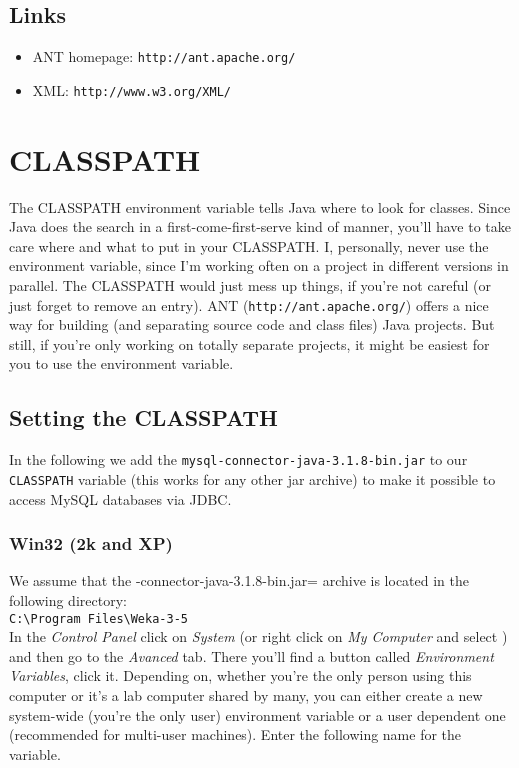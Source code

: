 \subsection{Links}
\begin{itemize}
\item ANT homepage: \verb=http://ant.apache.org/=
\item XML: \verb=http://www.w3.org/XML/=
\end{itemize}


\section{CLASSPATH}
\label{CLASSPATH}
The CLASSPATH environment variable tells Java where to look for
classes. Since Java does the search in a first-come-first-serve kind
of manner, you'll have to take care where and what to put in your
CLASSPATH. I, personally, never use the environment variable, since
I'm working often on a project in different versions in parallel. The
CLASSPATH would just mess up things, if you're not careful (or just
forget to remove an entry). ANT (\verb=http://ant.apache.org/=) offers
a nice way for building (and separating source code and class files)
Java projects. But still, if you're only working on totally separate
projects, it might be easiest for you to use the environment variable.

\subsection{Setting the CLASSPATH} 
In the following we add the \verb=mysql-connector-java-3.1.8-bin.jar=
to our \verb=CLASSPATH= variable (this works for any other jar archive) to make it possible to
access MySQL databases via JDBC.

\subsubsection*{Win32 (2k and XP)}
We assume that the \verbmysql-connector-java-3.1.8-bin.jar= archive is located in the following directory:\\

\verb=C:\Program Files\Weka-3-5=\\

\noindent In the \emph{Control Panel} click on \emph{System} (or right click on
\emph{My Computer} and select ) and then go to the
\emph{Avanced} tab. There you'll find a button called \emph{Environment
Variables}, click it. Depending on, whether you're the only person
using this computer or it's a lab computer shared by many, you can
either create a new system-wide (you're the only user) environment
variable or a user dependent one (recommended for multi-user
machines). Enter the following name for the variable.\\

